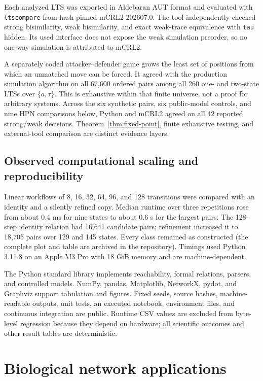 \documentclass{ws-jbcb}
\numberwithin{equation}{section}
\newcommand{\TAU}{\tau}
\begin{document}
Each analyzed LTS was exported in Aldebaran AUT format and evaluated with
\texttt{ltscompare} from hash-pinned mCRL2 202607.0.\cite{Bunte2019} The tool
independently checked strong bisimilarity, weak bisimilarity, and exact weak-trace
equivalence with \texttt{tau} hidden. Its used interface does not expose the weak
simulation preorder, so no one-way simulation is attributed to mCRL2.

A separately coded attacker--defender game grows the least set of positions from
which an unmatched move can be forced. It agreed with the production simulation
algorithm on all 67,600 ordered pairs among all 260 one- and two-state LTSs over
$\{a,\TAU\}$. This is exhaustive within that finite universe, not a proof for
arbitrary systems. Across the six synthetic pairs, six public-model controls,
and nine HPN comparisons below, Python and mCRL2 agreed on all 42 reported
strong/weak decisions. Theorem~\ref{thm:fixed-point}, finite exhaustive testing,
and external-tool comparison are distinct evidence layers.

\subsection{Observed computational scaling and reproducibility}
\label{sec:scalability-method}

Linear workflows of 8, 16, 32, 64, 96, and 128 transitions were compared with an
identity and a silently refined copy. Median runtime over three repetitions rose
from about 0.4 ms for nine states to about 0.6 s for the largest pairs. The
128-step identity relation had 16,641 candidate pairs; refinement increased it
to 18,705 pairs over 129 and 145 states. Every class remained as constructed
(the complete plot and table are archived in the repository). Timings used
Python 3.11.8 on an Apple M3 Pro with 18 GiB memory and are machine-dependent.

The Python standard library implements reachability, formal relations, parsers,
and controlled models. NumPy, pandas, Matplotlib, NetworkX, pydot, and Graphviz
support tabulation and figures. Fixed seeds, source hashes,
machine-readable outputs, unit tests, an executed notebook, environment files,
and continuous integration are public. Runtime CSV values are excluded from
byte-level regression because they depend on hardware; all scientific outcomes
and other result tables are deterministic.

\section{Biological network applications}
\label{sec:applications}
\end{document}
